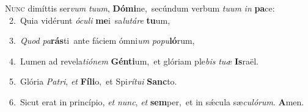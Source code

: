 \lettrine{\initial\textcolor{\initialcolor}{N}}{unc} dimíttis ser\textit{vum} \textit{tu}\-\textit{um}, \textbf{Dó}\-\textbf{mi}ne,~\star secúndum verbum \textit{tu}\-\textit{um} \textit{in} \textbf{pa}\-ce:\\
{\numbfont\textcolor{\numbcolor}{~2.}}~Quia vidérunt \textit{ó}\-\textit{cu}\textit{li} \textbf{me}\-i~\star sa\-\textit{lu}\-\textit{tá}\textit{re} \textbf{tu}\-um,\par
{\numbfont\textcolor{\numbcolor}{~3.}}~\textit{Quod} \textit{pa}\-\textbf{rás}ti~\star ante fáciem ómni\textit{um} \textit{po}\-\textit{pu}\textbf{ló}rum,\par
{\numbfont\textcolor{\numbcolor}{~4.}}~Lumen ad revela\-\textit{ti}\-\textit{ó}\textit{nem} \textbf{Gén}\-\textbf{ti}um,~\star et glóriam ple\textit{bis} \textit{tu}\-\textit{æ} \textbf{Is}\-raël.\par
{\numbfont\textcolor{\numbcolor}{~5.}}~Glória \textit{Pa}\-\textit{tri}, \textit{et} \textbf{Fí}\-\textbf{li}o,~\star et Spi\-\textit{rí}\-\textit{tu}\textit{i} \textbf{Sanc}\-to.\par
{\numbfont\textcolor{\numbcolor}{~6.}}~Sicut erat in princípio, \textit{et} \textit{nunc}\-, \textit{et} \textbf{sem}\-per,~\star et in sǽcula sæ\-\textit{cu}\-\textit{ló}\textit{rum}. \textbf{A}\-men.\par
